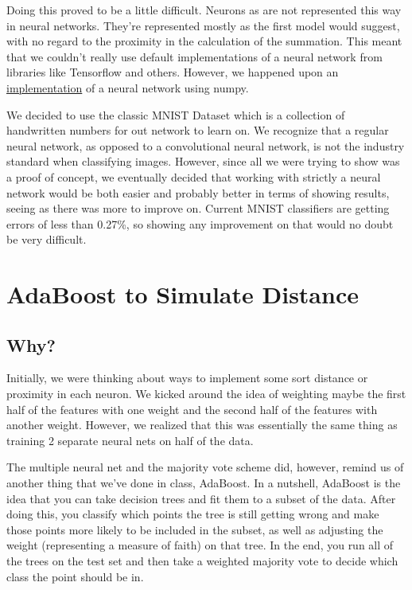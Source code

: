\documentclass[conference]{IEEEtran}
\begin{document}
Doing this proved to be a little difficult. Neurons as are not represented this way in neural networks. They’re represented mostly as the first model would suggest, with no regard to the proximity in the calculation of the summation. This meant that we couldn’t really use default implementations of a neural network from libraries like Tensorflow and others. However, we happened upon an \href{https://github.com/dennybritz/nn-from-scratch}{implementation} of a neural network using numpy.\newline

We decided to use the classic MNIST Dataset which is a collection of handwritten numbers for out network to learn on. We recognize that a regular neural network, as opposed to a convolutional neural network, is not the industry standard when classifying images. However, since all we were trying to show was a proof of concept, we eventually decided that working with strictly a neural network would be both easier and probably better in terms of showing results, seeing as there was more to improve on. Current MNIST classifiers are getting errors of less than 0.27\%, so showing any improvement on that would no doubt be very difficult.\newline

\section{AdaBoost to Simulate Distance}

\subsection{Why?}

Initially,  we were thinking about ways to implement some sort distance or proximity in each neuron. We kicked around the idea of weighting maybe the first half of the features with one weight and the second half of the features with another weight. However, we realized that this was essentially the same thing as training 2 separate neural nets on half of the data.\newline

The multiple neural net and the majority vote scheme did, however, remind us of another thing that we’ve done in class, AdaBoost. In a nutshell, AdaBoost is the idea that you can take decision trees and fit them to a subset of the data. After doing this, you classify which points the tree is still getting wrong and make those points more likely to be included in the subset, as well as adjusting the weight (representing a measure of faith) on that tree. In the end, you run all of the trees on the test set and then take a weighted majority vote to decide which class the point should be in.\newline
\end{document}
